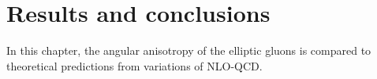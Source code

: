 
\chapter{Results and conclusions}

In this chapter, the angular anisotropy of the elliptic gluons is compared to theoretical predictions from variations of NLO-QCD.